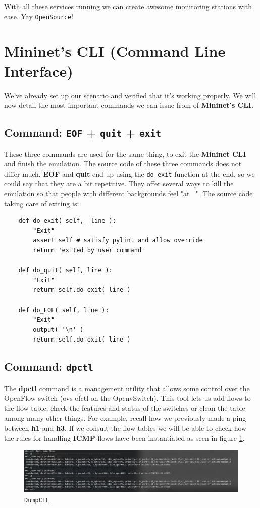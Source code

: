 \documentclass[12pt]{article}
\begin{document}
	With all these services running we can create awesome monitoring stations with ease. Yay \texttt{OpenSource}!

\section{Mininet's CLI (\textbf{C}ommand \textbf{L}ine \textbf{I}nterface)}
	We've already set up our scenario and verified that it's working properly. We will now detail the most important commands we can issue from of \textbf{Mininet's CLI}.

	\subsection{Command: \texttt{EOF} + \texttt{quit} + \texttt{exit}}
		These three commands are used for the same thing, to exit the \textbf{Mininet CLI} and finish the emulation. The source code of these three commands does not differ much, \textbf{EOF} and \textbf{quit} end up using the \texttt{do\_exit} function at the end, so we could say that they are a bit repetitive. They offer several ways to kill the emulation so that people with different backgrounds feel "at \texttt{~}". The source code taking care of exiting is:

		\begin{verbatim}
	def do_exit( self, _line ):
		"Exit"
		assert self # satisfy pylint and allow override
		return 'exited by user command'

	def do_quit( self, line ):
		"Exit"
		return self.do_exit( line )

	def do_EOF( self, line ):
		"Exit"
		output( '\n' )
		return self.do_exit( line )
		\end{verbatim}

	\subsection{Command: \texttt{dpctl}}
		The \textbf{dpctl} command is a management utility that allows some control over the OpenFlow switch (ovs-ofctl on the OpenvSwitch). This tool lets us add flows to the flow table, check the features and status of the switches or clean the table among many other things. For example, recall how we previously made a ping between \textbf{h1} and \textbf{h3}. If we consult the flow tables we will be able to check how the rules for handling \textbf{ICMP} flows have been instantiated as seen in figure \ref{f:dpctl}.

		\begin{figure}[!htb]
			\centering
			\includegraphics[width=\linewidth]{dpctl.png}
			\caption{\texttt{DumpCTL}}
			\label{f:dpctl}
		\end{figure}
\end{document}
